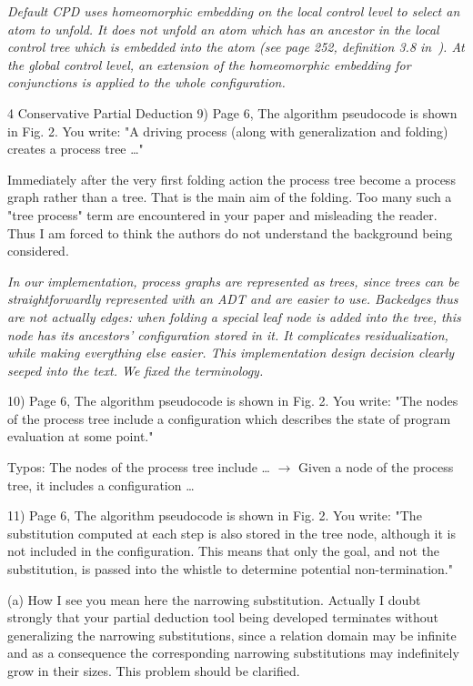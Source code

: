 \emph{Default CPD uses homeomorphic embedding on the local control level to select an atom to unfold. It does not unfold an atom which has an ancestor in the local control tree which is embedded into the atom (see page 252, definition 3.8 in~\cite{de1999conjunctive}). At the global control level, an extension of the homeomorphic embedding for conjunctions is applied to the whole configuration. }



4 Conservative Partial Deduction
9) Page 6, The algorithm pseudocode is shown in Fig. 2.
You write: "A driving process (along with generalization and folding) creates a process tree …"

 Immediately after the very first folding action the process tree become a process graph rather than a tree. That is the main aim of the folding. Too many such a "tree process" term are encountered in your paper and misleading the reader.  Thus I am forced to think the authors do not understand the background being considered.

\emph{In our implementation, process graphs are represented as trees, since trees can be straightforwardly represented with an ADT and are easier to use. Backedges thus are not actually edges: when folding a special leaf node is added into the tree, this node has its ancestors' configuration stored in it. It complicates residualization, while making everything else easier. This implementation design decision clearly seeped into the text. We fixed the terminology. }

10) Page 6, The algorithm pseudocode is shown in Fig. 2.
You write: "The nodes of the process tree include a configuration which describes the state of program evaluation at some point."

Typos: The nodes of the process tree include  … $\rightarrow$ Given a node of the process tree, it includes a configuration …

11) Page 6, The algorithm pseudocode is shown in Fig. 2.
You write: "The substitution computed at each step is also stored in the tree node, although it is not included in the configuration. This means that only the goal, and not the substitution, is passed into the whistle to determine potential non-termination."

(a) How I see you mean here the narrowing substitution. Actually I doubt strongly that your partial deduction tool being developed terminates without generalizing the narrowing substitutions, since a relation domain may be infinite and as a consequence the corresponding narrowing substitutions may indefinitely grow in their sizes. This problem should be clarified.

